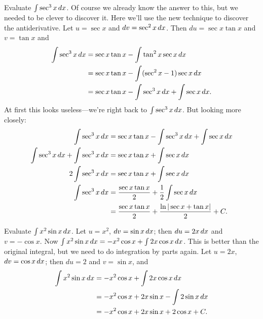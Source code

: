 \begin{example}
Evaluate $\int\sec^3 x\, d x$. Of course we already know the answer
to this, but we needed to be clever to discover it. Here we'll use the
new technique to discover the antiderivative.
Let $u=\sec x$ and $dv=\sec^2 x\, d x$. Then $du=\sec x\tan x$ and
$v=\tan x$ and
\begin{align*}
  \int\sec^3 x\, d x&=\sec x\tan x-\int \tan^2x\sec x\, d x \\
  &=\sec x\tan x-\int (\sec^2x-1)\sec x\, d x \\
  &=\sec x\tan x-\int \sec^3x\, d x +\int\sec x\, d x.
\end{align*}
At first this looks useless---we're right back to
$\int\sec^3x\, d x$. But looking more closely:
\begin{align*}
  \int\sec^3x\, d x&=\sec x\tan x-\int \sec^3x\, d x +\int\sec x\, d x \\
  \int\sec^3x\, d x+\int \sec^3x\, d x&=\sec x\tan x +\int\sec x\, d x \\
  2\int\sec^3x\, d x&=\sec x\tan x +\int\sec x\, d x \\
  \int\sec^3x\, d x&={\sec x\tan x\over2} +{1\over2}\int\sec x\, d x \\
  &={\sec x\tan x\over2} +{\ln|\sec x+\tan x|\over2}+C.
\end{align*}
\end{example}

\begin{example}
Evaluate $\int x^2\sin x\, d x$. 
Let $u=x^2$, $dv=\sin x\, d x$; then $du=2x\, d x$ and $v=-\cos x$. 
Now $\int x^2\sin x\, d x=-x^2\cos x+\int 2x\cos x\, d x$. This is
better than the original integral, but we need to do integration by
parts again. Let $u=2x$, $dv=\cos x\, d x$; then
$du=2$ and $v=\sin x$, and
\begin{align*}
  \int x^2\sin x\, d x&=-x^2\cos x+\int 2x\cos x\, d x \\
  &=-x^2\cos x+ 2x\sin x - \int 2\sin x\, d x \\
  &=-x^2\cos x+ 2x\sin x + 2\cos x + C. 
\end{align*}
\end{example}

